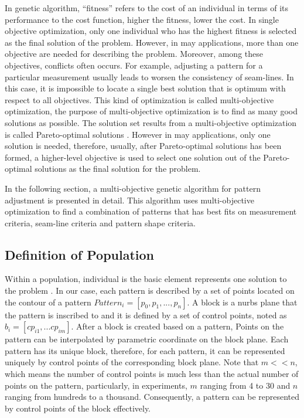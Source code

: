 In genetic algorithm, ``fitness'' refers to the cost of an individual in terms of its performance to the cost function, higher the fitness, lower the cost. In single objective optimization, only one individual who has the highest fitness is selected as the final solution of the problem. However, in may applications, more than one objective are needed for describing the problem. Moreover, among these objectives, conflicts often occurs. For example, adjusting a pattern for a particular measurement usually leads to worsen the consistency of seam-lines. In this case, it is impossible to locate a single best solution that is optimum with respect to all objectives. This kind of optimization is called multi-objective optimization, the purpose of multi-objective optimization is to find as many good solutions as possible. The solution set results from a multi-objective optimization is called Pareto-optimal solutions . However in may applications, only one solution is needed, therefore, usually, after Pareto-optimal solutions has been formed, a higher-level objective is used to select one solution out of the Pareto-optimal solutions as the final solution for the problem.

In the following section, a multi-objective genetic algorithm for pattern adjustment is presented in detail. This algorithm uses multi-objective optimization to find a combination of patterns that has best fits on measurement criteria, seam-line criteria and pattern shape criteria.

\subsection{Definition of Population}

Within a population, individual is the basic element represents one solution to the problem  . In our case, each pattern is described by a set of points located on the contour of a pattern $Pattern_{i} = [p_{0}, p_{1}, ..., p_{n}] $. A block is a nurbs plane that the pattern is inscribed to and it is defined by a set of control points, noted as $b_{i} = [cp_{i1},... cp_{im}]$.  After a block is created based on a pattern, Points on the pattern can be interpolated by parametric coordinate on the block plane. Each pattern has its unique block, therefore, for each pattern, it can be represented uniquely by control points of the corresponding block plane. Note that $m << n$, which means the number of control points is much less than the actual number of points on the pattern, particularly, in experiments, $m$ ranging from 4 to 30 and $n$ ranging from hundreds to a thousand. Consequently, a pattern can be represented by control points of the block effectively. 

